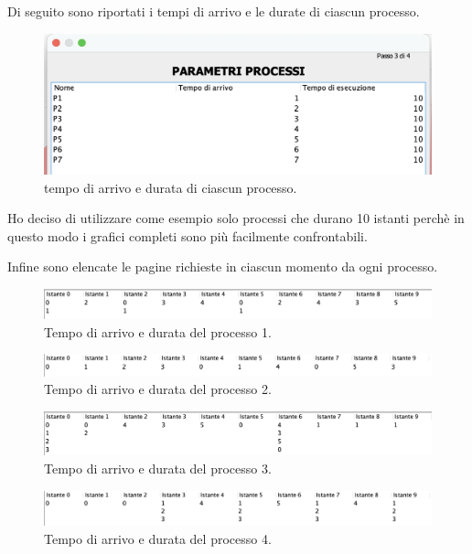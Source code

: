\documentclass[12px]{article}
\begin{document}
Di seguito sono riportati i tempi di arrivo e le durate di ciascun processo.
\begin{figure}[h]
	\centering
	\includegraphics[scale=0.25]{img/durata}
	\caption{tempo di arrivo e durata di ciascun processo.}
\end{figure}

Ho deciso di utilizzare come esempio solo processi che durano 10 istanti perchè in questo modo i grafici completi sono più facilmente confrontabili.

Infine sono elencate le pagine richieste in ciascun momento da ogni processo.
    \begin{figure}[!h]
        \centering
        \includegraphics[scale=0.3]{img/1}
        \caption{Tempo di arrivo e durata del processo 1.}
    \end{figure}

    \begin{figure}[!h]
        \centering
        \includegraphics[scale=0.3]{img/2}
        \caption{Tempo di arrivo e durata del processo 2.}
    \end{figure}

    \begin{figure}[!h]
        \centering
        \includegraphics[scale=0.3]{img/3}
        \caption{Tempo di arrivo e durata del processo 3.}
    \end{figure}

    \begin{figure}[!h]
        \centering
        \includegraphics[scale=0.3]{img/4}
        \caption{Tempo di arrivo e durata del processo 4.}
    \end{figure}
\end{document}

